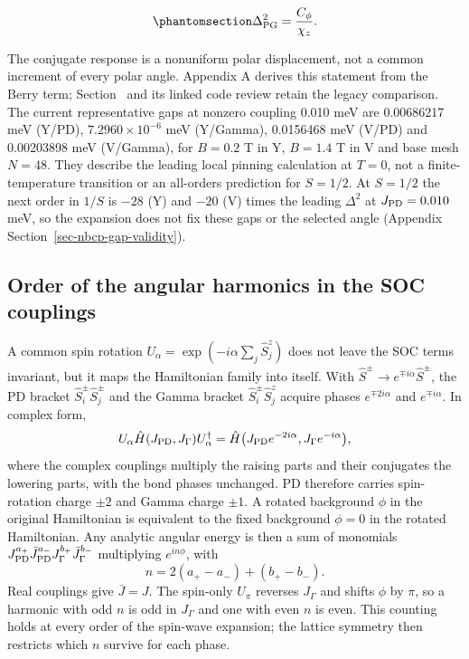 \begin{equation}\phantomsection\label{eq-nbcp-gap-summary}{
\Delta_{\rm PG}^2=\frac{C_\phi}{\chi_z}.
}\end{equation}

The conjugate response is a nonuniform polar displacement, not a common
increment of every polar angle. Appendix A derives this statement from
the Berry term; Section~ and its
linked code review retain the legacy comparison. The current
representative gaps at nonzero coupling 0.010 meV are 0.00686217 meV
(Y/PD), \(7.2960\times10^{-6}\) meV (Y/Gamma), 0.0156468 meV (V/PD) and
0.00203898 meV (V/Gamma), for \(B=0.2\) T in Y, \(B=1.4\) T in V and
base mesh \(N=48\). They describe the leading local pinning
calculation at \(T=0\), not a finite-temperature transition or an
all-orders prediction for \(S=1/2\). At \(S=1/2\) the next order in
\(1/S\) is \(-28\) (Y) and \(-20\) (V) times the leading \(\Delta^2\) at
\(J_{\rm PD}=0.010\) meV, so the expansion does not fix these gaps or
the selected angle (Appendix Section~\ref{sec-nbcp-gap-validity}).

\subsection{Order of the angular harmonics in the SOC
couplings}\label{sec-nbcp-yv-selection-rule}

A common spin rotation \(U_\alpha=\exp(-i\alpha\sum_j\hat S_j^z)\) does not
leave the SOC terms invariant, but it maps the Hamiltonian family into
itself. With \(\hat S^\pm\to e^{\mp i\alpha}\hat S^\pm\), the PD bracket
\(\hat S^\pm_i\hat S^\pm_j\) and the Gamma bracket
\(\hat S^\pm_i\hat S^z_j\) acquire phases \(e^{\mp2i\alpha}\) and
\(e^{\mp i\alpha}\). In complex form,
\begin{equation}\label{eq-nbcp-soc-charge}
U_\alpha\hat H(J_{\rm PD},J_\Gamma)U_\alpha^\dagger
=\hat H\bigl(J_{\rm PD}e^{-2i\alpha},J_\Gamma e^{-i\alpha}\bigr),
\end{equation}
where the complex couplings multiply the raising parts and their
conjugates the lowering parts, with the bond phases unchanged. PD
therefore carries spin-rotation charge \(\pm2\) and Gamma charge
\(\pm1\). A rotated background \(\phi\) in the original Hamiltonian is
equivalent to the fixed background \(\phi=0\) in the rotated Hamiltonian.
Any analytic angular energy is then a sum of monomials
\(J_{\rm PD}^{a_+}\bar J_{\rm PD}^{a_-}J_\Gamma^{b_+}\bar J_\Gamma^{b_-}\)
multiplying \(e^{in\phi}\), with
\begin{equation}\label{eq-nbcp-soc-selection}
n=2(a_+-a_-)+(b_+-b_-).
\end{equation}
Real couplings give \(\bar J=J\). The spin-only \(U_\pi\) reverses
\(J_\Gamma\) and shifts \(\phi\) by \(\pi\), so a harmonic with odd
\(n\) is odd in \(J_\Gamma\) and one with even \(n\) is even. This
counting holds at every order of the spin-wave expansion; the lattice
symmetry then restricts which \(n\) survive for each phase.


